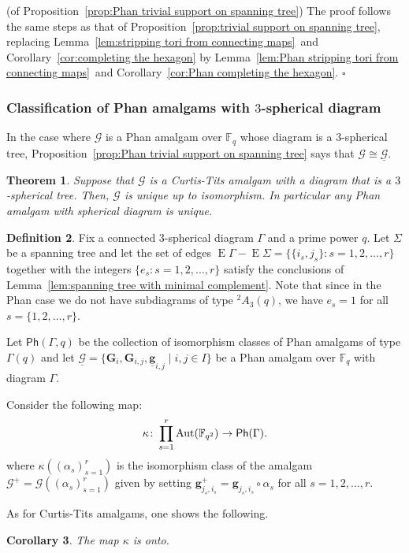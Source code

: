 \documentclass[12pt]{amsart}
\newtheorem{theorem}{Theorem}[section]
\newtheorem{corollary}[theorem]{Corollary}
\theoremstyle{definition}
\newtheorem{definition}[theorem]{Definition}
\newcommand{\bpf}{\noindent{\bf Proof}\hspace{7pt}}
\newcommand{\epf}{\qed}
\newcommand{\bth}{\begin{theorem}}
\renewcommand{\eth}{\end{theorem}}
\newcommand{\bco}{\begin{corollary}}
\newcommand{\eco}{\end{corollary}}
\newcommand{\bde}{\begin{definition}}
\newcommand{\ede}{\end{definition}}
\newcommand{\ul}{\underline}
\newcommand{\sPh}{{\mathsf{Ph}}}
\newcommand{\twA}{{}^2\! {A}}
\newcommand{\Aut}{\mathop{\rm Aut}\nolimits}
\newcommand{\FF}{{\mathbb F}}
\newcommand{\after}{\mathbin{ \circ }}
\renewcommand{\qed}{\hfill $\square$}
\newcommand{\amgrpG}{{\mathbf{G}}}
\newcommand{\amg}{{\mathbf g}}
\newcommand{\famg}{\ul{\mathbf g}}
\newcommand{\famG}{\ul{\mathscr{G}}}
\newcommand{\amG}{{\mathscr{G}}}
\DeclareMathOperator{\edg}{E}
\newcommand{\liediag}{\Gamma}
\begin{document}
\medskip
\bpf (of Proposition~\ref{prop:Phan trivial support on spanning tree})
The proof follows the same steps as that of Proposition~\ref{prop:trivial support on spanning tree}, replacing 
Lemma~\ref{lem:stripping tori from connecting maps}~and Corollary~\ref{cor:completing the hexagon} by 
Lemma~\ref{lem:Phan stripping tori from connecting maps}~and Corollary~\ref{cor:Phan completing the hexagon}.
\epf

\medskip
\subsubsection{Classification of  Phan amalgams with $3$-spherical diagram}\label{subsubsec:classification of 3-spherical Phan amalgams}
In the case where $\amG$ is a Phan  amalgam over $\FF_q$ whose diagram is a $3$-spherical tree,  Proposition~\ref{prop:Phan trivial support on spanning tree} says that $\amG\cong\famG$. 

\bth\label{thm:Phan 3 spherical tree}
Suppose that $\amG$ is a  Curtis-Tits amalgam with a diagram that is a $3$-spherical tree.
Then, $\amG$ is unique up to isomorphism. In particular any Phan amalgam with spherical diagram is unique.
\eth


\bde\label{dfn:P the map kappa}
Fix a connected $3$-spherical diagram $\liediag$ and a prime power $q$. Let  $\Sigma$  be a spanning tree and let the set of edges $\edg\liediag-\edg\Sigma=\{\{i_s,j_s\}\colon s=1,2,\ldots,r\}$ together with the integers $\{e_s\colon s=1,2,\ldots,r\}$ satisfy the conclusions of Lemma~\ref{lem:spanning tree with minimal complement}.
Note that since in the Phan case we do not have subdiagrams of type $\twA_3(q)$, we have $e_s=1$ for all $s=\{1,2,\ldots,r\}$.

Let $\sPh(\liediag,q)$ be the collection of isomorphism classes of  Phan  amalgams of type $\liediag(q)$ and let $\famG=\{\amgrpG_i,\amgrpG_{i,j},\famg_{i,j}\mid i,j\in I\}$ be a  Phan amalgam over $\FF_q$ with diagram $\liediag$.

Consider the following map:
\begin{align*}
\kappa\colon\prod_{s=1}^r \Aut(\FF_{q^2})\to \sPh(\liediag).
\end{align*}
where $\kappa((\alpha_s)_{s=1}^r)$ is the isomorphism class of the amalgam $\amG^+=\amG((\alpha_s)_{s=1}^r)$ given by setting $\amg^+_{j_s,i_s}=\amg_{j_s,i_s}\after \alpha_s$ for all $s=1,2,\ldots,r$.
\ede

As for Curtis-Tits amalgams, one shows the following.
\bco\label{cor:P kappa is onto}
The map $\kappa$ is onto.
\eco
\end{document}
